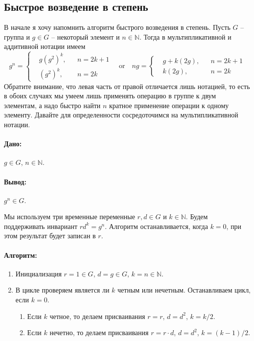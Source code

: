 \subsection{Быстрое возведение в степень}

В начале я хочу напомнить алгоритм быстрого возведения в степень.
Пусть $G$ -- группа и $g\in G$ -- некоторый элемент и $n \in \mathbb N$.
Тогда в мультипликативной и аддитивной нотации имеем
\[
g^n = 
\left\{
\begin{aligned}
&g (g^2)^{k}, & &n = 2k + 1\\
&(g^2)^k, & &n = 2k
\end{aligned}
\right.
\quad\text{or}\quad
ng = 
\left\{
\begin{aligned}
&g + k(2g), & &n = 2k + 1\\
&k (2g), & &n = 2k
\end{aligned}
\right.
\]
Обратите внимание, что левая часть от правой отличается лишь нотацией, то есть в обоих случаях мы умеем лишь применять операцию в группе к двум элементам, а надо быстро найти $n$ кратное применение операции к одному элементу.
Давайте для определенности сосредоточимся на мультипликативной нотации.

\paragraph{Дано:}

$g\in G$, $n\in \mathbb N$.

\paragraph{Вывод:}

$g^n\in G$.

Мы используем три временные переменные $r, d\in G$ и $k\in \mathbb N$.
Будем поддерживать инвариант  $r d^k = g^n$.
Алгоритм останавливается, когда $k = 0$, при этом результат будет записан в $r$.

\paragraph{Алгоритм:}

\begin{enumerate}
\item Инициализация $r = 1\in G$, $d = g \in G$, $k = n\in \mathbb N$.

\item В цикле проверяем является ли $k$ четным или нечетным.
Останавливаем цикл, если $k = 0$.
\begin{enumerate}
\item Если $k$ четное, то делаем присваивания $r = r$, $d = d^2$, $k = k / 2$.

\item Если $k$ нечетно, то делаем присваивания $r = r \cdot d$, $d = d^2$, $k = (k-1) / 2$.
\end{enumerate}
\end{enumerate}

